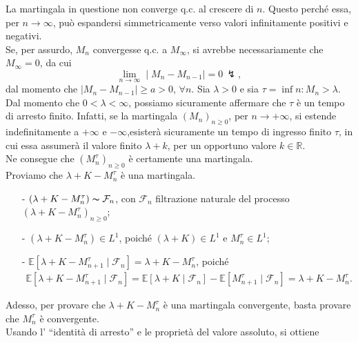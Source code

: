 \documentclass[12pt]{homework}
\begin{document}
\begin{enumerate}
  \newpage
  \begin{alphaparts}
  \questionpart
  La martingala in questione non converge q.c. al crescere di $n$. Questo perché essa, per $n\rightarrow \infty$, può espandersi simmetricamente verso valori infinitamente positivi e negativi.\\
  Se, per assurdo, $M_{n}$ convergesse q.c. a $M_{\infty}$, si avrebbe necessariamente che $M_{\infty}=0$, da cui
  \begin{equation*}
  \lim\limits_{n\rightarrow \infty}\mid M_{n}-M_{n-1}\mid=0 \,\lightning,
  \end{equation*}
   dal momento che $\mid M_{n}-M_{n-1}\mid\geq a>0$, $\forall n$. 
   \questionpart
   Sia $\lambda>0$ e sia $\tau=\inf{n:M_{n}>\lambda}$.\\
   Dal momento che $0<\lambda<\infty$, possiamo sicuramente affermare che $\tau$ è un tempo di arresto finito. Infatti, se la martingala $\left(M_{n}\right)_{n\geq 0}$, per $n\rightarrow +\infty$, si estende indefinitamente a $+\infty$ e $-\infty$,esisterà sicuramente un tempo di ingresso finito $\tau$, in cui essa assumerà il valore finito $\lambda + k$, per un opportuno valore $k\in \mathbb{R}$.\\
   Ne consegue che $\left(M_{n}^{\tau}\right)_{n\geq 0}$ è certamente una martingala.\\
   Proviamo che $\lambda+K-M_{n}^{\tau}$ è una martingala.
   \begin{itemize}
   \item[-]
   $\left(\lambda+K-M_{n}^{\tau}\right)\thicksim\mathcal{F}_{n}$, con $\mathcal{F}_{n}$ filtrazione naturale del processo $\left(\lambda+K-M_{n}^{\tau}\right)_{n\geq 0}$;
   \item[-]
   $\left(\lambda+K-M_{n}^{\tau}\right)\in L^{1}$, poiché $\left(\lambda+K\right)\in L^{1}$ e $M_{n}^{\tau}\in L^{1}$;
   \item[-]
   $\mathbb{E}[\lambda+K-M_{n+1}^{\tau}\mid \mathcal{F}_{n}]=\lambda+K-M_{n}^{\tau}$, poiché
   \begin{align*}
   \mathbb{E}[\lambda+K-M_{n+1}^{\tau}\mid \mathcal{F}_{n}]=\mathbb{E}[\lambda+K\mid \mathcal{F}_{n}]-\mathbb{E}[M_{n+1}^{\tau}\mid \mathcal{F}_{n}]=\lambda+K-M_{n}^{\tau}.
   \end{align*}
  \end{itemize}    
    Adesso, per provare che $\lambda+K-M_{n}^{\tau}$ è una martingala convergente, basta provare che $M_{n}^{\tau}$ è convergente.\\
    Usando l' ``identità di arresto'' e le proprietà del valore assoluto, si ottiene

\end{alphaparts}
\end{enumerate}
\end{document}
